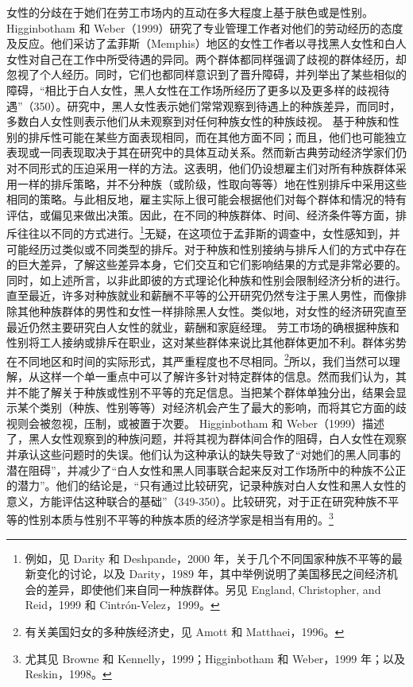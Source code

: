 \documentclass[UTF8]{ctexart}
\begin{document}
女性的分歧在于她们在劳工市场内的互动在多大程度上基于肤色或是性别。Higginbotham 和 Weber（1999）研究了专业管理工作者对他们的劳动经历的态度及反应。他们采访了孟菲斯（Memphis）地区的女性工作者以寻找黑人女性和白人女性对自己在工作中所受待遇的异同。两个群体都同样强调了歧视的群体经历，却忽视了个人经历。同时，它们也都同样意识到了晋升障碍，并列举出了某些相似的障碍，“相比于白人女性，黑人女性在工作场所经历了更多以及更多样的歧视待遇”（350）。研究中，黑人女性表示她们常常观察到待遇上的种族差异，而同时，多数白人女性则表示他们从未观察到对任何种族女性的种族歧视。
基于种族和性别的排斥性可能在某些方面表现相同，而在其他方面不同；而且，他们也可能独立表现或一同表现取决于其在研究中的具体互动关系。然而新古典劳动经济学家们仍对不同形式的压迫采用一样的方法。这表明，他们仍设想雇主们对所有种族群体采用一样的排斥策略，并不分种族（或阶级，性取向等等）地在性别排斥中采用这些相同的策略。与此相反地，雇主实际上很可能会根据他们对每个群体和情况的特有评估，或偏见来做出决策。因此，在不同的种族群体、时间、经济条件等方面，排斥往往以不同的方式进行。\footnote[11]{例如，见 Darity 和 Deshpande，2000 年，关于几个不同国家种族不平等的最新变化的讨论，以及 Darity，1989 年，其中举例说明了美国移民之间经济机会的差异，即使他们来自同一种族群体。另见 England, Christopher, and Reid，1999 和 Cintrón-Velez，1999。}无疑，在这项位于孟菲斯的调查中，女性感知到，并可能经历过类似或不同类型的排斥。对于种族和性别接纳与排斥人们的方式中存在的巨大差异，了解这些差异本身，它们交互和它们影响结果的方式是非常必要的。同时，如上述所言，以非此即彼的方式理论化种族和性别会限制经济分析的进行。
直至最近，许多对种族就业和薪酬不平等的公开研究仍然专注于黑人男性，而像排除其他种族群体的男性和女性一样排除黑人女性。类似地，对女性的经济研究直至最近仍然主要研究白人女性的就业，薪酬和家庭经理。
劳工市场的确根据种族和性别将工人接纳或排斥在职业，这对某些群体来说比其他群体更加不利。群体劣势在不同地区和时间的实际形式，其严重程度也不尽相同。\footnote[12]{有关美国妇女的多种族经济史，见 Amott 和 Matthaei，1996。}所以，我们当然可以理解，从这样一个单一重点中可以了解许多针对特定群体的信息。然而我们认为，其并不能了解关于种族或性别不平等的充足信息。当把某个群体单独分出，结果会显示某个类别（种族、性别等等）对经济机会产生了最大的影响，而将其它方面的歧视则会被忽视，压制，或被置于次要。
Higginbotham 和 Weber（1999）描述了，黑人女性观察到的种族问题，并将其视为群体间合作的阻碍，白人女性在观察并承认这些问题时的失误。他们认为这种承认的缺失导致了“对她们的黑人同事的潜在阻碍”，并减少了“白人女性和黑人同事联合起来反对工作场所中的种族不公正的潜力”。他们的结论是，“只有通过比较研究，记录种族对白人女性和黑人女性的意义，方能评估这种联合的基础”（349-350）。比较研究，对于正在研究种族不平等的性别本质与性别不平等的种族本质的经济学家是相当有用的。\footnote[13]{尤其见 Browne 和 Kennelly，1999；Higginbotham 和 Weber，1999 年；以及 Reskin，1998。}
\end{document}

